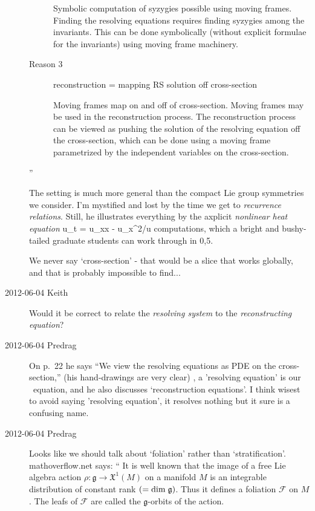\begin{description}
\begin{description}
Symbolic computation of syzygies possible using moving frames.
Finding the resolving equations requires finding syzygies among the
invariants. This can be done symbolically (without explicit
formulae for the invariants) using moving frame machinery.
  \item[Reason 3]
  reconstruction = mapping RS solution off cross-section

Moving frames map on and off of cross-section.
Moving frames may be used in the reconstruction process. The
reconstruction process can be viewed as pushing the solution of the
resolving equation off the cross-section, which can be done using a
moving frame parametrized by the independent variables on the
cross-section.
\end{description}

''


The setting is much more general than the compact Lie group symmetries we
consider.
I'm mystified and lost by the time we get to \emph{recurrence relations}.
Still, he illustrates everything by the axplicit \emph{nonlinear heat equation}
\beq
u_t = u_{xx} - u_{x}^2/u
computations,
which a bright and bushy-tailed graduate students can work through in 0,5.

We never say `cross-section' - that would be a slice that works globally,
and that is probably impossible to find...

\item[2012-06-04 Keith]  Would it be correct to relate the
\emph{resolving system} to the \emph{reconstructing equation}?

\item[2012-06-04 Predrag]
On p.~22 he says ``We view the resolving equations as PDE on the cross-section,''
(his hand-drawings are very clear)
\ie, a 'resolving equation' is our \reducedsp\ equation, and he also discusses
`reconstruction equations'. I think wisest to avoid
saying 'resolving equation', it resolves nothing but it sure is a confusing name.

\item[2012-06-04 Predrag] Looks like we should talk about `foliation'
rather than `stratification'.
{mathoverflow.net} says: ``
It is well known that the image of a free Lie algebra action
$\rho:\mathfrak{g}\to\mathfrak{X}^1(M)$ on a manifold $M$ is an
integrable distribution of constant rank $(=\rm{dim}\;\mathfrak{g})$.
Thus it defines a foliation $\mathcal{F}$ on $M$. The leafs of
$\mathcal{F}$ are called the $\mathfrak{g}$-orbits of the action.


\end{description}
